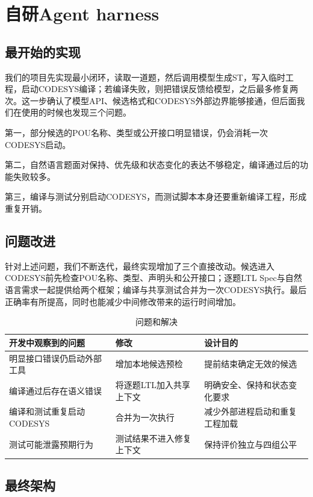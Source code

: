 \documentclass[UTF8,a4paper,zihao=-4]{ctexart}
\begin{document}
\section{自研Agent harness}

\subsection{最开始的实现}
我们的项目先实现最小闭环，读取一道题，然后调用模型生成ST，写入临时工程，启动CODESYS编译；若编译失败，则把错误反馈给模型，之后最多修复两次。这一步确认了模型API、候选格式和CODESYS外部边界能够接通，但后面我们在使用的时候也发现三个问题。

第一，部分候选的POU名称、类型或公开接口明显错误，仍会消耗一次CODESYS启动。

第二，自然语言题面对保持、优先级和状态变化的表达不够稳定，编译通过后的功能失败较多。

第三，编译与测试分别启动CODESYS，而测试脚本本身还要重新编译工程，形成重复开销。

\subsection{问题改进}
针对上述问题，我们不断迭代，最终实现增加了三个直接改动。候选进入CODESYS前先检查POU名称、类型、声明头和公开接口；逐题LTL Spec与自然语言需求一起提供给两个框架；编译与共享测试合并为一次CODESYS执行。最后正确率有所提高，同时也能减少中间修改带来的运行时间增加。



\begin{table}[H]
  \centering
  \caption{问题和解决}
  \begin{tabularx}{\textwidth}{L{3.2cm}L{4.5cm}X}
    \toprule
    开发中观察到的问题 & 修改 & 设计目的\\
    \midrule
    明显接口错误仍启动外部工具 & 增加本地候选预检 & 提前结束确定无效的候选\\
    编译通过后存在语义错误 & 将逐题LTL加入共享上下文 & 明确安全、保持和状态变化要求\\
    编译和测试重复启动CODESYS & 合并为一次执行 & 减少外部进程启动和重复工程加载\\
    测试可能泄露预期行为 & 测试结果不进入修复上下文 & 保持评价独立与四组公平\\
    \bottomrule
  \end{tabularx}
\end{table}

\subsection{最终架构}
\end{document}
